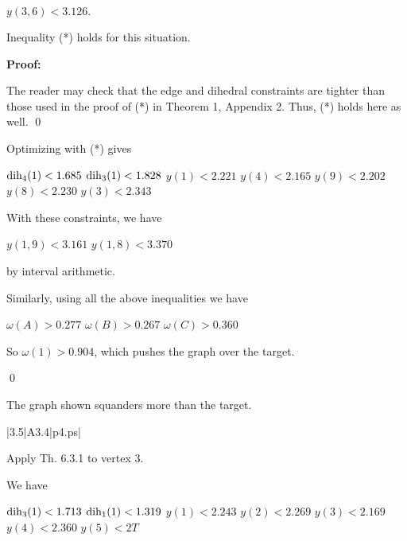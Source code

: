 $y(3,6)<3.126.$

 Inequality (*) holds for this situation. \endproclaim

{\bf Proof:}

The reader may check that the edge and dihedral constraints are tighter than
those used in the proof of (*) in Theorem 1, Appendix 2.  Thus, (*) holds here as well. \qed

Optimizing with (*) gives

$\operatorname{dih}_4(1) < 1.685$ \newline
$\operatorname{dih}_3(1) < 1.828$ \newline
$y(1)<2.221$ \newline
$y(4)<2.165$ \newline
$y(9)<2.202$ \newline
$y(8)<2.230$ \newline
$y(3)<2.343$ \newline


With these constraints, we have

$y(1,9) < 3.161$ \newline
$y(1,8) < 3.370$ \newline

by interval arithmetic.

Similarly, using all the above inequalities we have

$\omega(A) > 0.277$ \newline
$\omega(B) > 0.267$ \newline
$\omega(C)> 0.360$ \newline

So $\omega(1)>0.904$, which pushes the graph over the target.

\qed


\bigskip



 The graph shown 
squanders more than the target.  \endproclaim

\gram|3.5|A3.4|p4.ps|  %

Apply Th. 6.3.1 to vertex 3.

We have 

$\operatorname{dih}_3(1) < 1.713$ \newline
$\operatorname{dih}_1(1) < 1.319$ \newline
$y(1)<2.243$ \newline
$y(2)<2.269$ \newline
$y(3)<2.169$ \newline
$y(4)<2.360$ \newline
$y(5)<2T$ \newline

